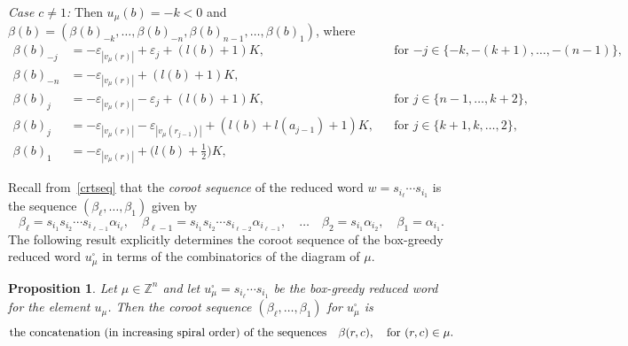 \documentclass[11pt]{article}
\theoremstyle{plain}
\newtheorem{prop}[thm]{Proposition}
\theoremstyle{definition}
\theoremstyle{remark}
\numberwithin{equation}{section}
\def\ZZ{\mathbb{Z}}
\newcounter{r}
\newcounter{s}
\begin{document}
\smallskip\noindent
\emph{Case $c\ne1$:} Then $u_\mu(b) = -k<0$ and $\beta(b) = (\beta(b)_{-k}, \ldots, \beta(b)_{-n}, \beta(b)_{n-1}, \ldots, \beta(b)_1)$, where
\begin{align}
\beta(b)_{-j} &= -\varepsilon_{|v_\mu(r)|} + \varepsilon_j + ( l(b)+1)K,
&&\text{for $-j\in \{-k, -(k+1), \ldots, -(n-1)\}$,}
\nonumber
\\
\beta(b)_{-n} &= - \varepsilon_{|v_\mu(r)|} + (l(b)+1) K,
\nonumber  \\
\beta(b)_j &= - \varepsilon_{|v_\mu(r)|} - \varepsilon_j + (l(b)+1)K, 
&& \text{for $j\in \{n-1, \ldots, k+2\}$,} 
\label{rtseqb}
\\
\beta(b)_j &= - \varepsilon_{|v_\mu(r)|} - \varepsilon_{|v_\mu(r_{j-1})|} + (l(b)+l(a_{j-1})+1)K, 
&& \text{for $j \in \{k+1, k, \ldots, 2\}$,}
\nonumber  \\
\beta(b)_1 &= - \varepsilon_{|v_\mu(r)|} + (l(b)+\textstyle \frac{1}{2} \displaystyle)K, 
\nonumber
\end{align}


Recall from~\eqref{crtseq} that the \emph{coroot sequence} of the reduced word $w=s_{i_\ell}\cdots s_{i_1}$ is the sequence
$(\beta_\ell,\ldots, \beta_1)$ given by
\begin{equation*}
\beta_\ell = 
s_{i_1}s_{i_2}\cdots s_{i_{\ell-1}}\alpha_{i_\ell}, \quad
\beta_{\ell-1} = 
s_{i_1}s_{i_2}\cdots s_{i_{\ell-2}}\alpha_{i_{\ell-1}}, \quad \ldots \quad
\beta_2 = s_{i_1}\alpha_{i_2}, \quad
\beta_1 = \alpha_{i_1}.
\end{equation*}
The following result explicitly determines the coroot sequence of the box-greedy reduced word $u_\mu^\square$ in terms of the
combinatorics of the diagram of $\mu$.

\begin{prop}
\label{prop:boxgreedycoroot}
Let $\mu \in \ZZ^{n}$ and let $u_\mu^\square = s_{i_\ell}\cdots s_{i_1}$ be the box-greedy reduced word for the element $u_\mu$.
Then the coroot sequence $(\beta_\ell, \ldots, \beta_1)$ for $u_\mu^\square$ is 
$$\hbox{the concatenation (in increasing spiral order) of the sequences}\quad
\beta(r,c), \quad\hbox{for $(r,c)\in \mu$.}$$
\end{prop}
\end{document}

